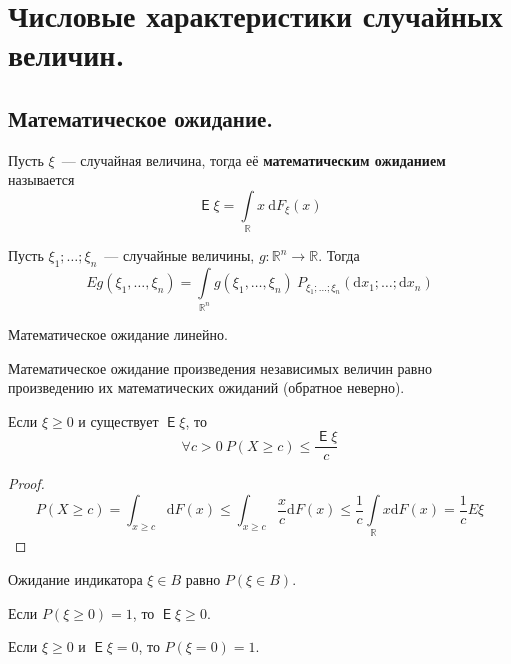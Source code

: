 \documentclass{article}
\DeclareMathOperator{\Expected}{\mathsf{E}}
\begin{document}
    \section{Числовые характеристики случайных величин.}
    \subsection{Математическое ожидание.}
    \begin{definition}
        Пусть $\xi$~--- случайная величина, тогда её \textbf{математическим ожиданием} называется
        $$
        \Expected\xi=\int\limits_\mathbb Rx~\mathrm dF_\xi(x)
        $$
    \end{definition}
    \begin{property}
        Пусть $\xi_1;\ldots;\xi_n$~--- случайные величины, $g\colon\mathbb R^n\to\mathbb R$. Тогда
        $$
        Eg(\xi_1,\ldots,\xi_n)=\int\limits_{\mathbb R^n}g(\xi_1,\ldots,\xi_n)~P_{\xi_1;\ldots;\xi_n}(\mathrm dx_1;\ldots;\mathrm dx_n)
        $$
    \end{property}
    \begin{property}
        Математическое ожидание линейно.
    \end{property}
    \begin{property}
        Математическое ожидание произведения независимых величин равно произведению их математических ожиданий (обратное неверно).
    \end{property}
    \begin{theorem}
        \label{Неравенство Маркова}
        Если $\xi\geqslant0$ и существует $\Expected\xi$, то
        $$
        \forall c>0~P(X\geqslant c)\leqslant\frac{\Expected\xi}c
        $$
    \end{theorem}
    \begin{proof}
        $$
        P(X\geqslant c)=\int_{x\geqslant c}\mathrm dF(x)\leqslant\int_{x\geqslant c}\frac xc\mathrm dF(x)\leqslant\frac1c\int\limits_{\mathbb R}x\mathrm dF(x)=\frac1cE\xi
        $$
    \end{proof}
    \begin{corollary}
        Ожидание индикатора $\xi\in B$ равно $P(\xi\in B)$.
    \end{corollary}
    \begin{property}
        Если $P(\xi\geqslant0)=1$, то $\Expected\xi\geqslant0$.
    \end{property}
    \begin{property}
        Если $\xi\geqslant0$ и $\Expected\xi=0$, то $P(\xi=0)=1$.
    \end{property}
\end{document}
